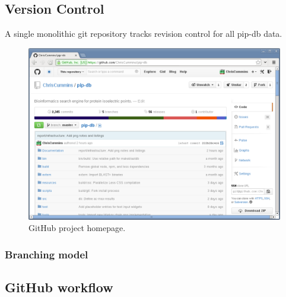 \subsection{Version Control}\label{subsec:version-control}
A single monolithic git \cite{chacon2009pro} repository tracks
revision control for all pip-db data.

\cite{finley2011github}


\begin{figure}[H]
\centering
    \includegraphics[width=\textwidth]{assets/github}
\caption[GitHub project homepage]
        {GitHub project homepage.}
\label{fig:github-project}
\end{figure}


\subsubsection{Branching model}

\cite{driessen2012successful}

\subsection{GitHub workflow}\label{subsec:github-workflow}





